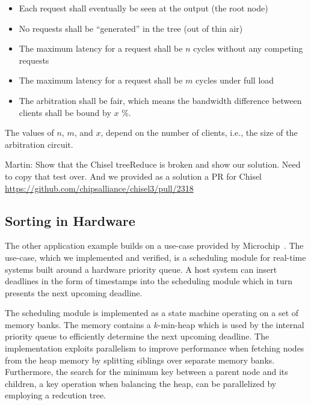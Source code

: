 \documentclass[conference]{IEEEtran}
\newcommand{\martin}[1]{{\color{blue} Martin: #1}}
\begin{document}
\begin{itemize}
\item Each request shall eventually be seen at the output (the root node)
\item No requests shall be ``generated'' in the tree (out of thin air)
\item The maximum latency for a request shall be $n$ cycles without any competing requests
\item The maximum latency for a request shall be $m$ cycles under full load
\item The arbitration shall be fair, which means the bandwidth difference between clients shall be bound by $x$ \%.
\end{itemize}

The values of $n$, $m$, and $x$, depend on the number of clients, i.e., the size of the arbitration
circuit.

\martin{Show that the Chisel treeReduce is broken and show our solution. Need to copy that test
over. And we provided as a solution a PR for Chisel \url{https://github.com/chipsalliance/chisel3/pull/2318}}



\subsection{Sorting in Hardware}


The other application example builds on a use-case provided
by Microchip~\cite{microchip}. The use-case, which we implemented and verified, is a scheduling module for real-time systems built around a hardware priority queue.
A host system can insert deadlines in the form of timestamps into the scheduling module which in turn presents the next upcoming deadline.

The scheduling module is implemented as a state machine 
operating on a set of memory banks. The memory contains a $k$-min-heap which is used by the internal priority queue to efficiently determine the next upcoming deadline. The implementation exploits parallelism to improve performance when fetching nodes from the heap memory by splitting siblings over separate memory banks. Furthermore, the search for the minimum key between a parent node and its children, a key operation when balancing the heap, can be parallelized by employing a redcution tree.

\end{document}
